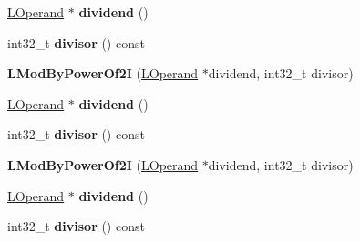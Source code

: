 \begin{DoxyCompactItemize}
\item 
\hyperlink{classv8_1_1internal_1_1_l_operand}{L\+Operand} $\ast$ {\bfseries dividend} ()\hypertarget{classv8_1_1internal_1_1_l_mod_by_power_of2_i_ac13f14bd9208161205a94315c67fab0c}{}\label{classv8_1_1internal_1_1_l_mod_by_power_of2_i_ac13f14bd9208161205a94315c67fab0c}

\item 
int32\+\_\+t {\bfseries divisor} () const \hypertarget{classv8_1_1internal_1_1_l_mod_by_power_of2_i_a9edbee4d9db4a80578d3182db42ecd95}{}\label{classv8_1_1internal_1_1_l_mod_by_power_of2_i_a9edbee4d9db4a80578d3182db42ecd95}

\item 
{\bfseries L\+Mod\+By\+Power\+Of2I} (\hyperlink{classv8_1_1internal_1_1_l_operand}{L\+Operand} $\ast$dividend, int32\+\_\+t divisor)\hypertarget{classv8_1_1internal_1_1_l_mod_by_power_of2_i_ae24bf80084199df5a60259d7c07cdcbf}{}\label{classv8_1_1internal_1_1_l_mod_by_power_of2_i_ae24bf80084199df5a60259d7c07cdcbf}

\item 
\hyperlink{classv8_1_1internal_1_1_l_operand}{L\+Operand} $\ast$ {\bfseries dividend} ()\hypertarget{classv8_1_1internal_1_1_l_mod_by_power_of2_i_ac13f14bd9208161205a94315c67fab0c}{}\label{classv8_1_1internal_1_1_l_mod_by_power_of2_i_ac13f14bd9208161205a94315c67fab0c}

\item 
int32\+\_\+t {\bfseries divisor} () const \hypertarget{classv8_1_1internal_1_1_l_mod_by_power_of2_i_a9edbee4d9db4a80578d3182db42ecd95}{}\label{classv8_1_1internal_1_1_l_mod_by_power_of2_i_a9edbee4d9db4a80578d3182db42ecd95}

\item 
{\bfseries L\+Mod\+By\+Power\+Of2I} (\hyperlink{classv8_1_1internal_1_1_l_operand}{L\+Operand} $\ast$dividend, int32\+\_\+t divisor)\hypertarget{classv8_1_1internal_1_1_l_mod_by_power_of2_i_ae24bf80084199df5a60259d7c07cdcbf}{}\label{classv8_1_1internal_1_1_l_mod_by_power_of2_i_ae24bf80084199df5a60259d7c07cdcbf}

\item 
\hyperlink{classv8_1_1internal_1_1_l_operand}{L\+Operand} $\ast$ {\bfseries dividend} ()\hypertarget{classv8_1_1internal_1_1_l_mod_by_power_of2_i_ac13f14bd9208161205a94315c67fab0c}{}\label{classv8_1_1internal_1_1_l_mod_by_power_of2_i_ac13f14bd9208161205a94315c67fab0c}

\item 
int32\+\_\+t {\bfseries divisor} () const \hypertarget{classv8_1_1internal_1_1_l_mod_by_power_of2_i_a9edbee4d9db4a80578d3182db42ecd95}{}\label{classv8_1_1internal_1_1_l_mod_by_power_of2_i_a9edbee4d9db4a80578d3182db42ecd95}


\end{DoxyCompactItemize}
